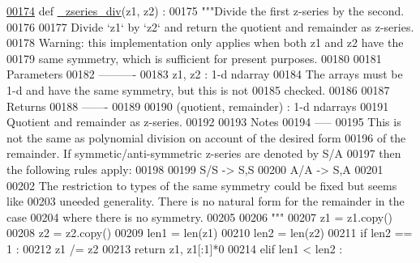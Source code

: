 \begin{DoxyCode}
\hypertarget{namespacepyneb_1_1utils_1_1chebyshev_l00174}{}\hyperlink{namespacepyneb_1_1utils_1_1chebyshev_ad00f2653194746fa98c3421eb7c26f2c}{00174} \textcolor{keyword}{def }\hyperlink{namespacepyneb_1_1utils_1_1chebyshev_ad00f2653194746fa98c3421eb7c26f2c}{\_zseries\_div}(z1, z2) :
00175     \textcolor{stringliteral}{"""Divide the first z-series by the second.}
00176 \textcolor{stringliteral}{}
00177 \textcolor{stringliteral}{    Divide `z1` by `z2` and return the quotient and remainder as z-series.}
00178 \textcolor{stringliteral}{    Warning: this implementation only applies when both z1 and z2 have the}
00179 \textcolor{stringliteral}{    same symmetry, which is sufficient for present purposes.}
00180 \textcolor{stringliteral}{}
00181 \textcolor{stringliteral}{    Parameters}
00182 \textcolor{stringliteral}{    ----------}
00183 \textcolor{stringliteral}{    z1, z2 : 1-d ndarray}
00184 \textcolor{stringliteral}{        The arrays must be 1-d and have the same symmetry, but this is not}
00185 \textcolor{stringliteral}{        checked.}
00186 \textcolor{stringliteral}{}
00187 \textcolor{stringliteral}{    Returns}
00188 \textcolor{stringliteral}{    -------}
00189 \textcolor{stringliteral}{}
00190 \textcolor{stringliteral}{    (quotient, remainder) : 1-d ndarrays}
00191 \textcolor{stringliteral}{        Quotient and remainder as z-series.}
00192 \textcolor{stringliteral}{}
00193 \textcolor{stringliteral}{    Notes}
00194 \textcolor{stringliteral}{    -----}
00195 \textcolor{stringliteral}{    This is not the same as polynomial division on account of the desired form}
00196 \textcolor{stringliteral}{    of the remainder. If symmetic/anti-symmetric z-series are denoted by S/A}
00197 \textcolor{stringliteral}{    then the following rules apply:}
00198 \textcolor{stringliteral}{}
00199 \textcolor{stringliteral}{    S/S -> S,S}
00200 \textcolor{stringliteral}{    A/A -> S,A}
00201 \textcolor{stringliteral}{}
00202 \textcolor{stringliteral}{    The restriction to types of the same symmetry could be fixed but seems like}
00203 \textcolor{stringliteral}{    uneeded generality. There is no natural form for the remainder in the case}
00204 \textcolor{stringliteral}{    where there is no symmetry.}
00205 \textcolor{stringliteral}{}
00206 \textcolor{stringliteral}{    """}
00207     z1 = z1.copy()
00208     z2 = z2.copy()
00209     len1 = len(z1)
00210     len2 = len(z2)
00211     \textcolor{keywordflow}{if} len2 == 1 :
00212         z1 /= z2
00213         \textcolor{keywordflow}{return} z1, z1[:1]*0
00214     \textcolor{keywordflow}{elif} len1 < len2 :

\end{DoxyCode}
